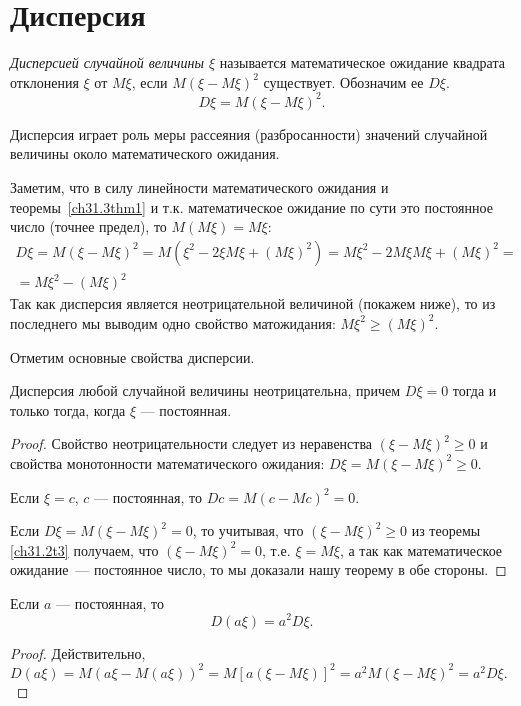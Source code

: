 \section{Дисперсия}
\begin{defn}
\textit{Дисперсией случайной величины $\xi$} называется математическое ожидание квадрата отклонения $\xi$ от $M\xi$, если $M(\xi-M\xi)^2$ существует. Обозначим ее $D\xi$. 
\begin{equation} \label{ch31.4eq1}
D\xi=M(\xi-M\xi)^2.
\end{equation}
\end{defn}

Дисперсия играет роль меры рассеяния (разбросанности) значений случайной величины около математического ожидания.

Заметим, что в силу линейности математического ожидания и теоремы~\ref{ch31.3thm1}\; и т.к. математическое ожидание по сути это постоянное число (точнее предел), то $M(M\xi)=M\xi$:
\begin{multline*}
D\xi = M(\xi-M\xi)^2=M(\xi^2-2\xi M\xi+(M\xi)^2)=M\xi^2-2M\xi M\xi+(M\xi)^2=\\=M\xi^2-(M\xi)^2
\end{multline*}
Так как дисперсия является неотрицательной величиной (покажем ниже), то из последнего мы выводим одно свойство матожидания: $M\xi^2\ge(M\xi)^2$.

Отметим основные свойства дисперсии.

\begin{thm} Дисперсия любой случайной величины неотрицательна, причем $D\xi = 0$ тогда и только тогда, когда $\xi$ --- постоянная. 
\end{thm}
\begin{proof}
Свойство неотрицательности следует из неравенства $(\xi - M \xi)^2 \ge 0$ и свойства монотонности математического ожидания: $D \xi = M (\xi - M \xi)^2 \ge 0$.

Если $\xi = c$, $c$ --- постоянная, то $D c = M (c - M c)^2 = 0$. 

Если $D\xi=M (\xi - M \xi)^2=0$, то учитывая, что $(\xi - M \xi)^2\ge 0$ из теоремы \ref{ch31.2t3} получаем, что $(\xi - M \xi)^2=0$, т.е. $\xi=M\xi$, а так как математическое ожидание~--- постоянное число, то мы доказали нашу теорему в обе стороны.
\end{proof}
\begin{thm} Если $a$ --- постоянная, то $$D(a\xi) = a^2 D\xi.$$
\end{thm}
\begin{proof}
Действительно, $D(a\xi) = M(a\xi - M (a\xi))^2 = M [a (\xi - M \xi)]^2 = a^2M(\xi - M\xi)^2 = a^2 D\xi.$
\end{proof}

